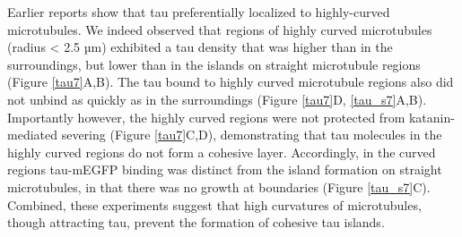 Earlier reports show that tau preferentially localized to highly-curved microtubules\parencite{Samsonov2004}. We indeed observed that regions of highly curved microtubules (radius < 2.5 µm) exhibited a tau density that was higher than in the surroundings, but lower than in the islands on straight microtubule regions (Figure \ref{tau7}A,B). The tau bound to highly curved microtubule regions also did not unbind as quickly as in the surroundings (Figure \ref{tau7}D, \ref{tau_s7}A,B). Importantly however, the highly curved regions were not protected from katanin-mediated severing (Figure \ref{tau7}C,D), demonstrating that tau molecules in the highly curved regions do not form a cohesive layer. Accordingly, in the curved regions tau-mEGFP binding was distinct from the island formation on straight microtubules, in that there was no growth at boundaries (Figure \ref{tau_s7}C). Combined, these experiments suggest that high curvatures of microtubules, though attracting tau, prevent the formation of cohesive tau islands.